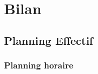 
\chapter{Bilan} %

\label{Chapter4} %



\section{Planning Effectif}

\subsection{Planning horaire}

